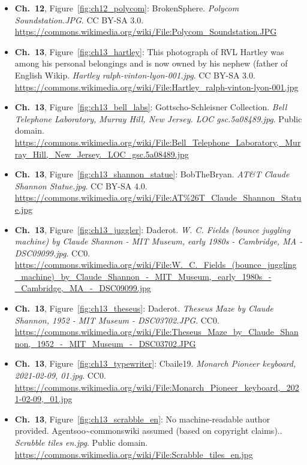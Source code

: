 \begin{small}
\begin{itemize}[leftmargin=0pt,itemsep=2pt,label={}]
\item \textbf{Ch.~12}, Figure~\ref{fig:ch12_polycom}: BrokenSphere. \emph{Polycom Soundstation.\allowbreak{}JPG}. CC BY-SA 3.0. \url{https://commons.wikimedia.org/wiki/File:Polycom_Soundstation.JPG}
\item \textbf{Ch.~13}, Figure~\ref{fig:ch13_hartley}: This photograph of RVL Hartley was among his personal belongings and is now owned by his nephew (father of English Wikip. \emph{Hartley ralph-\allowbreak{}vinton-\allowbreak{}lyon-\allowbreak{}001.\allowbreak{}jpg}. CC BY-SA 3.0. \url{https://commons.wikimedia.org/wiki/File:Hartley_ralph-vinton-lyon-001.jpg}
\item \textbf{Ch.~13}, Figure~\ref{fig:ch13_bell_labs}: Gottscho-Schleisner Collection. \emph{Bell Telephone Laboratory, Murray Hill, New Jersey.\allowbreak{} LOC gsc.\allowbreak{}5a08489.\allowbreak{}jpg}. Public domain. \url{https://commons.wikimedia.org/wiki/File:Bell_Telephone_Laboratory,_Murray_Hill,_New_Jersey._LOC_gsc.5a08489.jpg}
\item \textbf{Ch.~13}, Figure~\ref{fig:ch13_shannon_statue}: BobTheBryan. \emph{AT\&T Claude Shannon Statue.\allowbreak{}jpg}. CC BY-SA 4.0. \url{https://commons.wikimedia.org/wiki/File:AT%26T_Claude_Shannon_Statue.jpg}
\item \textbf{Ch.~13}, Figure~\ref{fig:ch13_juggler}: Daderot. \emph{W.\allowbreak{} C.\allowbreak{} Fields (bounce juggling machine) by Claude Shannon -\allowbreak{} MIT Museum, early 1980s -\allowbreak{} Cambridge, MA -\allowbreak{} DSC09099.\allowbreak{}jpg}. CC0. \url{https://commons.wikimedia.org/wiki/File:W._C._Fields_(bounce_juggling_machine)_by_Claude_Shannon_-_MIT_Museum,_early_1980s_-_Cambridge,_MA_-_DSC09099.jpg}
\item \textbf{Ch.~13}, Figure~\ref{fig:ch13_theseus}: Daderot. \emph{Theseus Maze by Claude Shannon, 1952 -\allowbreak{} MIT Museum -\allowbreak{} DSC03702.\allowbreak{}JPG}. CC0. \url{https://commons.wikimedia.org/wiki/File:Theseus_Maze_by_Claude_Shannon,_1952_-_MIT_Museum_-_DSC03702.JPG}
\item \textbf{Ch.~13}, Figure~\ref{fig:ch13_typewriter}: Cbaile19. \emph{Monarch Pioneer keyboard, 2021-\allowbreak{}02-\allowbreak{}09, 01.\allowbreak{}jpg}. CC0. \url{https://commons.wikimedia.org/wiki/File:Monarch_Pioneer_keyboard,_2021-02-09,_01.jpg}
\item \textbf{Ch.~13}, Figure~\ref{fig:ch13_scrabble_en}: No machine-readable author provided. Agentsoo\textasciitilde{}commonswiki assumed (based on copyright claims).. \emph{Scrabble tiles en.\allowbreak{}jpg}. Public domain. \url{https://commons.wikimedia.org/wiki/File:Scrabble_tiles_en.jpg}

\end{itemize}
\end{small}
